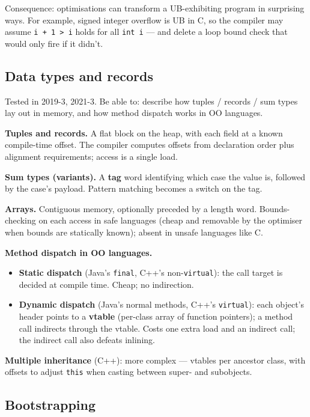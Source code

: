\documentclass[11pt,a4paper]{article}
\begin{document}
Consequence: optimisations can transform a UB-exhibiting program in surprising ways. For example, signed integer overflow is UB in C, so the compiler may assume \verb|i + 1 > i| holds for all \verb|int i| --- and delete a loop bound check that would only fire if it didn't.

\subsection{Data types and records}

\begin{useful}
Tested in 2019-3, 2021-3. Be able to: describe how tuples / records / sum types lay out in memory, and how method dispatch works in OO languages.
\end{useful}

\textbf{Tuples and records.} A flat block on the heap, with each field at a known compile-time offset. The compiler computes offsets from declaration order plus alignment requirements; access is a single load.

\textbf{Sum types (variants).} A \textbf{tag} word identifying which case the value is, followed by the case's payload. Pattern matching becomes a switch on the tag.

\textbf{Arrays.} Contiguous memory, optionally preceded by a length word. Bounds-checking on each access in safe languages (cheap and removable by the optimiser when bounds are statically known); absent in unsafe languages like C.

\textbf{Method dispatch in OO languages.}
\begin{itemize}[leftmargin=*,itemsep=0pt]
  \item \textbf{Static dispatch} (Java's \texttt{final}, C++'s non-\texttt{virtual}): the call target is decided at compile time. Cheap; no indirection.
  \item \textbf{Dynamic dispatch} (Java's normal methods, C++'s \texttt{virtual}): each object's header points to a \textbf{vtable} (per-class array of function pointers); a method call indirects through the vtable. Costs one extra load and an indirect call; the indirect call also defeats inlining.
\end{itemize}

\textbf{Multiple inheritance} (C++): more complex --- vtables per ancestor class, with offsets to adjust \verb|this| when casting between super- and subobjects.

\subsection{Bootstrapping}
\end{document}
